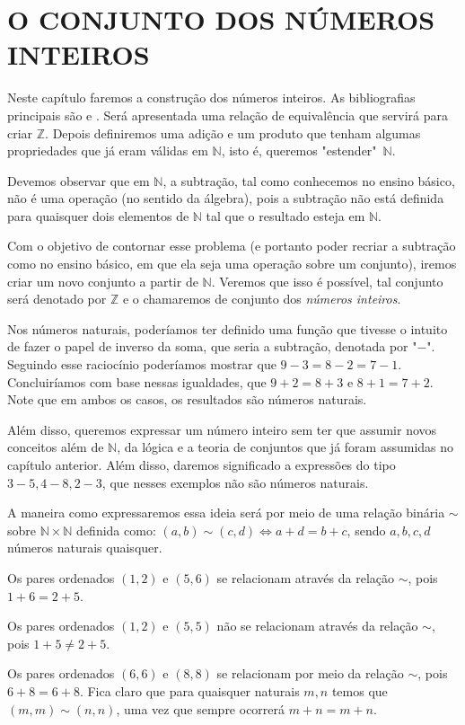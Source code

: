 \documentclass[../main.tex]{subfiles}
\begin{document}
\chapter{O CONJUNTO DOS NÚMEROS INTEIROS}\label{cap-inteiros}
Neste capítulo faremos a construção dos números inteiros. As bibliografias principais são \textcite{ferreira} e \textcite{domingues-2009}. Será apresentada uma relação de equivalência que servirá para criar $\mathbb{Z}$. Depois definiremos uma adição e um produto que tenham algumas propriedades que já eram válidas em $\mathbb{N}$, isto é, queremos "estender"\ $\mathbb{N}$.

Devemos observar que em $\mathbb{N}$, a subtração, tal como conhecemos no ensino básico, não é uma operação (no sentido da álgebra), pois a subtração não está definida para quaisquer dois elementos de $\mathbb{N}$ tal que o resultado esteja em $\mathbb{N}$.

Com o objetivo de contornar esse problema (e portanto poder recriar a subtração como no ensino básico, em que ela seja uma operação sobre um conjunto), iremos criar um novo conjunto a partir de $\mathbb{N}$. Veremos que isso é possível, tal conjunto será denotado por $\mathbb{Z}$ e o chamaremos de conjunto dos \emph{números inteiros}.

Nos números naturais, poderíamos ter definido uma função que tivesse o intuito de fazer o papel de inverso da soma, que seria a subtração, denotada por "$-$". Seguindo esse raciocínio poderíamos mostrar que $9-3 = 8-2 = 7-1$. Concluiríamos com base nessas igualdades, que $9 + 2 = 8 + 3$ e $8 + 1 = 7 + 2$. Note que em ambos os casos, os resultados são números naturais. 

Além disso, queremos expressar um número inteiro sem ter que assumir novos conceitos além de $\mathbb{N}$, da lógica e a teoria de conjuntos que já foram assumidas no capítulo anterior. Além disso, daremos significado a expressões do tipo $3-5, 4-8, 2-3$, que nesses exemplos não são números naturais.

A maneira como expressaremos essa ideia será por meio de uma relação binária $\sim$ sobre $\mathbb{N} \times \mathbb{N}$ definida como: $(a,b) \sim (c,d) \iff a+d = b+c$, sendo $a,b,c,d$ números naturais quaisquer.

\begin{ex}
    Os pares ordenados $(1,2)$ e $(5,6)$ se relacionam através da relação $\sim$, pois $1+6 = 2+5$.
\end{ex}
\begin{ex}
    Os pares ordenados $(1,2)$ e $(5,5)$ não se relacionam através da relação $\sim$, pois $1+5 \neq 2+5$.
\end{ex}
\begin{ex}\label{int-ex-elementosRelacionadosPorSim}
    Os pares ordenados $(6,6)$ e $(8,8)$ se relacionam por meio da relação $\sim$, pois $6+8 = 6+8$. Fica claro que para quaisquer naturais $m,n$ temos que $(m,m) \sim (n,n)$, uma vez que sempre ocorrerá $m+n = m+n$.
\end{ex}
\end{document}
